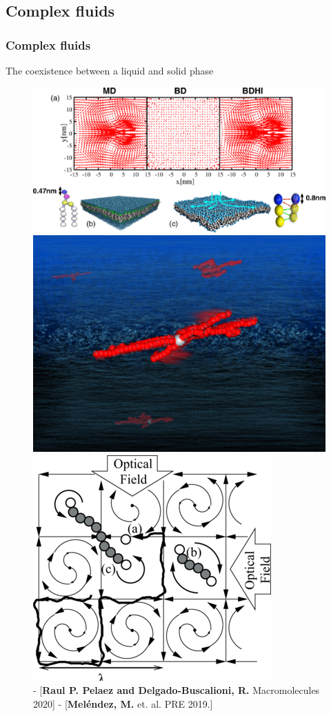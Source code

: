 \documentclass[xcolor=dvipsnames, compress]{beamer}
\begin{document}
\subsection{Complex fluids}
\begin{frame}
  \frametitle{Complex fluids}
\centering \Large  The coexistence between a liquid and solid phase
  \begin{figure}
    \centering
    \includegraphics[width=0.5\linewidth]{membrane}\includegraphics[width=0.2\linewidth]{star}
    \includegraphics[width=0.2\linewidth]{optofluidics}\\
    {\fontsize{4.5}{12}   -  [{\bf Raul P. Pelaez and Delgado-Buscalioni, R.} Macromolecules 2020]    -   [{\bf  Mel\'endez, M.} et. al. PRE 2019.]}\\

\end{figure}
\end{frame}
\end{document}
